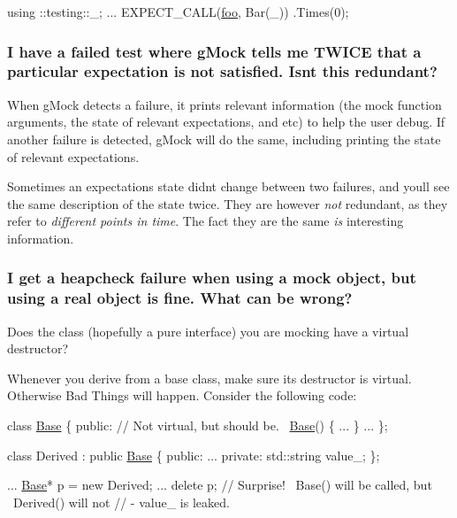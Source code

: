 \begin{DoxyCode}
using ::testing::\_;
...
  EXPECT\_CALL(\mbox{\hyperlink{namespacefoo}{foo}}, Bar(\_))
      .Times(0);
\end{DoxyCode}


\subsubsection*{I have a failed test where g\+Mock tells me T\+W\+I\+CE that a particular expectation is not satisfied. Isn\textquotesingle{}t this redundant?}

When g\+Mock detects a failure, it prints relevant information (the mock function arguments, the state of relevant expectations, and etc) to help the user debug. If another failure is detected, g\+Mock will do the same, including printing the state of relevant expectations.

Sometimes an expectation\textquotesingle{}s state didn\textquotesingle{}t change between two failures, and you\textquotesingle{}ll see the same description of the state twice. They are however {\itshape not} redundant, as they refer to {\itshape different points in time}. The fact they are the same {\itshape is} interesting information.

\subsubsection*{I get a heapcheck failure when using a mock object, but using a real object is fine. What can be wrong?}

Does the class (hopefully a pure interface) you are mocking have a virtual destructor?

Whenever you derive from a base class, make sure its destructor is virtual. Otherwise Bad Things will happen. Consider the following code\+:


\begin{DoxyCode}
\textcolor{keyword}{class }\mbox{\hyperlink{classBase}{Base}} \{
 \textcolor{keyword}{public}:
  \textcolor{comment}{// Not virtual, but should be.}
  ~\mbox{\hyperlink{classBase}{Base}}() \{ ... \}
  ...
\};

\textcolor{keyword}{class }Derived : \textcolor{keyword}{public} \mbox{\hyperlink{classBase}{Base}} \{
 \textcolor{keyword}{public}:
  ...
 \textcolor{keyword}{private}:
  std::string value\_;
\};

...
  \mbox{\hyperlink{classBase}{Base}}* p = \textcolor{keyword}{new} Derived;
  ...
  \textcolor{keyword}{delete} p;  \textcolor{comment}{// Surprise! ~Base() will be called, but ~Derived() will not}
                 \textcolor{comment}{// - value\_ is leaked.}
\end{DoxyCode}


